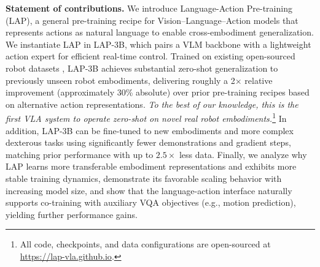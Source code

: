 \noindent\textbf{Statement of contributions.} We introduce Language-Action Pre-training (LAP), a general pre-training recipe for Vision--Language--Action models that represents actions as natural language to enable cross-embodiment generalization. We instantiate LAP in \textsc{LAP-3B}, which pairs a VLM backbone with a lightweight action expert for efficient real-time control. Trained on existing open-sourced robot datasets \cite{embodimentcollaboration2025openxembodimentroboticlearning, khazatsky2025droidlargescaleinthewildrobot, lee2025molmoactactionreasoningmodels}, \textsc{LAP-3B} achieves substantial zero-shot generalization to previously unseen robot embodiments, delivering roughly a 2× relative improvement (approximately 30\% absolute) over prior pre-training recipes based on alternative action representations. \emph{To the best of our knowledge, this is the first VLA system to operate zero-shot on novel real robot embodiments.}\footnote{All code, checkpoints, and data configurations are open-sourced at \href{https://lap-vla.github.io}{https://lap-vla.github.io}.}
In addition, \textsc{LAP-3B} can be fine-tuned to new embodiments and more complex dexterous tasks using significantly fewer demonstrations and gradient steps, matching prior performance with up to $2.5\times$ less data. Finally, we analyze why LAP learns more transferable embodiment representations and exhibits more stable training dynamics, demonstrate its favorable scaling behavior with increasing model size, and show that the language-action interface naturally supports co-training with auxiliary VQA objectives (e.g., motion prediction), yielding further performance gains.
